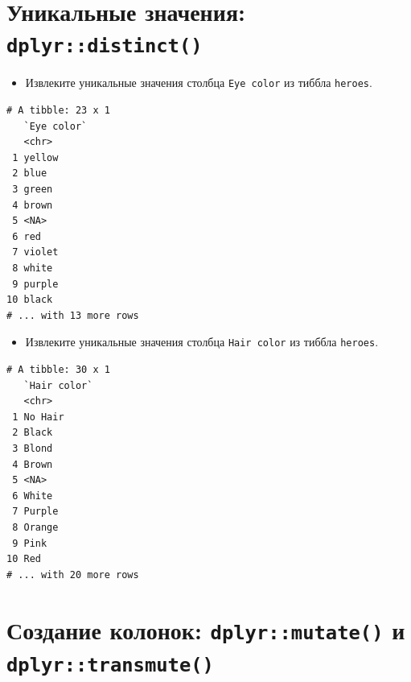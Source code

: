 \documentclass[
]{book}
\newenvironment{Shaded}{\begin{snugshade}}{\end{snugshade}}
\newcommand{\DataTypeTok}[1]{\textcolor[rgb]{0.13,0.29,0.53}{#1}}
\newcommand{\KeywordTok}[1]{\textcolor[rgb]{0.13,0.29,0.53}{\textbf{#1}}}
\newcommand{\NormalTok}[1]{#1}
\newcommand{\OperatorTok}[1]{\textcolor[rgb]{0.81,0.36,0.00}{\textbf{#1}}}
\newcommand{\StringTok}[1]{\textcolor[rgb]{0.31,0.60,0.02}{#1}}
\providecommand{\tightlist}{%
  \setlength{\itemsep}{0pt}\setlength{\parskip}{0pt}}
\begin{document}
\hypertarget{solution_dist}{%
\section{\texorpdfstring{Уникальные значения: \texttt{dplyr::distinct()}}{Уникальные значения: dplyr::distinct()}}\label{solution_dist}}

\begin{itemize}
\tightlist
\item
  Извлеките уникальные значения столбца \texttt{Eye\ color} из тиббла \texttt{heroes}.
\end{itemize}

\begin{Shaded}
\end{Shaded}

\begin{verbatim}
# A tibble: 23 x 1
   `Eye color`
   <chr>      
 1 yellow     
 2 blue       
 3 green      
 4 brown      
 5 <NA>       
 6 red        
 7 violet     
 8 white      
 9 purple     
10 black      
# ... with 13 more rows
\end{verbatim}

\begin{itemize}
\tightlist
\item
  Извлеките уникальные значения столбца \texttt{Hair\ color} из тиббла \texttt{heroes}.
\end{itemize}

\begin{Shaded}
\end{Shaded}

\begin{verbatim}
# A tibble: 30 x 1
   `Hair color`
   <chr>       
 1 No Hair     
 2 Black       
 3 Blond       
 4 Brown       
 5 <NA>        
 6 White       
 7 Purple      
 8 Orange      
 9 Pink        
10 Red         
# ... with 20 more rows
\end{verbatim}

\hypertarget{solution_mutate}{%
\section{\texorpdfstring{Создание колонок: \texttt{dplyr::mutate()} и \texttt{dplyr::transmute()}}{Создание колонок: dplyr::mutate() и dplyr::transmute()}}\label{solution_mutate}}
\end{document}

